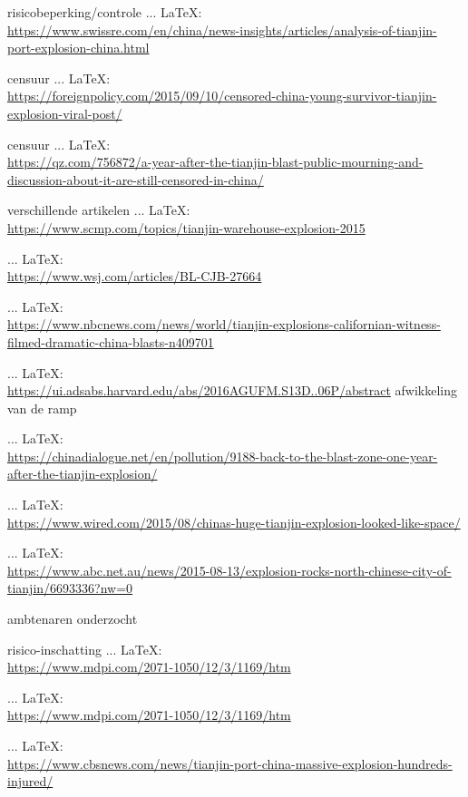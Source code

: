 \begin{thebibliography}{99}
    risicobeperking/controle
     ... \LaTeX:\\ \url{https://www.swissre.com/en/china/news-insights/articles/analysis-of-tianjin-port-explosion-china.html}

    censuur
     ... \LaTeX:\\ \url{https://foreignpolicy.com/2015/09/10/censored-china-young-survivor-tianjin-explosion-viral-post/}

    censuur
     ... \LaTeX:\\ \url{https://qz.com/756872/a-year-after-the-tianjin-blast-public-mourning-and-discussion-about-it-are-still-censored-in-china/}

    verschillende artikelen
     ... \LaTeX:\\ \url{https://www.scmp.com/topics/tianjin-warehouse-explosion-2015}

     ... \LaTeX:\\ \url{https://www.wsj.com/articles/BL-CJB-27664}

     ... \LaTeX:\\ \url{https://www.nbcnews.com/news/world/tianjin-explosions-californian-witness-filmed-dramatic-china-blasts-n409701}

     ... \LaTeX:\\ \url{https://ui.adsabs.harvard.edu/abs/2016AGUFM.S13D..06P/abstract}
    afwikkeling van de ramp

     ... \LaTeX:\\ \url{https://chinadialogue.net/en/pollution/9188-back-to-the-blast-zone-one-year-after-the-tianjin-explosion/}

     ... \LaTeX:\\ \url{https://www.wired.com/2015/08/chinas-huge-tianjin-explosion-looked-like-space/}

     ... \LaTeX:\\ \url{https://www.abc.net.au/news/2015-08-13/explosion-rocks-north-chinese-city-of-tianjin/6693336?nw=0}

    ambtenaren onderzocht
    
    risico-inschatting
     ... \LaTeX:\\ \url{https://www.mdpi.com/2071-1050/12/3/1169/htm}

     ... \LaTeX:\\ \url{https://www.mdpi.com/2071-1050/12/3/1169/htm}

     ... \LaTeX:\\ \url{https://www.cbsnews.com/news/tianjin-port-china-massive-explosion-hundreds-injured/}


\end{thebibliography}
